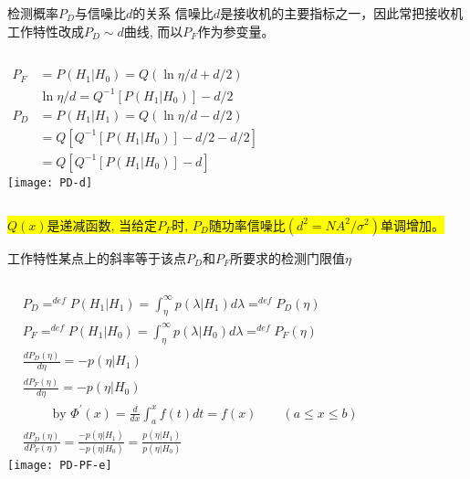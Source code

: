\begin{frame}[shrink]{检测概率$P_D$与信噪比$d$的关系}
信噪比$d$是接收机的主要指标之一，因此常把接收机工作特性改成$P_D\sim d$曲线, 而以$P_F$作为参变量。
\begin{columns}
	\begin{align*}
	P_F&=P(H_1|H_0)=Q(\ln\eta/d+d/2)\\ 
	&\ln\eta/d=Q^{-1}[P(H_1|H_0)]-d/2\\
	P_D&=P(H_1|H_1)=Q\left(\ln\eta/d-d/2\right)\\
	&=Q[Q^{-1}[P(H_1|H_0)]-d/2-d/2]\\
	&=Q[Q^{-1}[P(H_1|H_0)]-d]
	\end{align*}
	\texttt{[image: PD-d]}
\end{columns}

\medskip

\colorbox{yellow}{$Q(x)$是递减函数, 当给定$P_F$时, $P_D$随功率信噪比$(d^2=NA^2/\sigma^2)$单调增加。} 
\end{frame}

\begin{frame}[shrink]{工作特性某点上的斜率等于该点$P_D$和$P_F$所要求的检测门限值$\eta$}
\begin{columns}
	\begin{align*}
	&P_D\mathop{=}^{def}P(H_1|H_1)=\int_{\eta}^{\infty}p(\lambda|H_1)d\lambda\mathop{=}^{def}P_D(\eta) \\
	&P_F\mathop{=}^{def}P(H_1|H_0)=\int_{\eta}^{\infty}p(\lambda|H_0)d\lambda\mathop
	{=}^{def}P_F(\eta) \\
	&\frac{dP_D(\eta)}{d\eta} =-p(\eta|H_1) \\ 
	&\frac{dP_F(\eta)}{d\eta} =-p(\eta|H_0) \\ 
	&\qquad \text{ by } \Phi^\prime(x)=\frac{d}{dx}\int_a^xf(t)dt=f(x)\qquad (a\le x\le b) \\
	&\frac{dP_D(\eta)}{dP_F(\eta)} =\frac{-p(\eta|H_1)}{-p(\eta|H_0)}=\frac{p(\eta|H_1)}{p(\eta|H_0)}
	\end{align*}
	\texttt{[image: PD-PF-e]}
\end{columns}
\end{frame}


